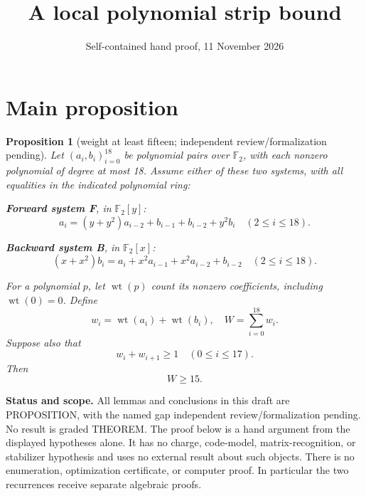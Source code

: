 \documentclass{article}
\title{A local polynomial strip bound}
\author{}
\date{Self-contained hand proof, 11 November 2026}
\newtheorem*{mainproposition}{Proposition}
\DeclareMathOperator{\wt}{wt}
\begin{document}
\maketitle

\section{Main proposition}\label{sec:main}

\begin{mainproposition}[weight at least fifteen; independent review\slash formalization pending]
  Let \((a_i,b_i)_{i=0}^{18}\) be polynomial pairs over \(\mathbb{F}_2\), with each nonzero
  polynomial of degree at most 18. Assume either of these two systems, with all equalities in the
  indicated polynomial ring:

  \textbf{Forward system F}, in \(\mathbb{F}_2[y]\):
  \begin{equation}\label{eq:forward}
    a_i = (y + y^2) a_{i-2} + b_{i-1} + b_{i-2} + y^2 b_i \quad (2 \le i \le 18).
  \end{equation}

  \textbf{Backward system B}, in \(\mathbb{F}_2[x]\):
  \begin{equation}\label{eq:backward}
    (x + x^2) b_i = a_i + x^2 a_{i-1} + x^2 a_{i-2} + b_{i-2} \quad (2 \le i \le 18).
  \end{equation}

  For a polynomial \(p\), let \(\wt(p)\) count its nonzero coefficients, including
  \(\wt(0) = 0\). Define
  \begin{equation}
    w_i = \wt(a_i) + \wt(b_i), \quad W = \sum_{i=0}^{18} w_i.
  \end{equation}
  Suppose also that
  \begin{equation}\label{eq:adjacent}
    w_i + w_{i+1} \ge 1 \quad (0 \le i \le 17).
  \end{equation}
  Then
  \begin{equation}\label{eq:main-bound}
    W \ge 15.
  \end{equation}
\end{mainproposition}

\textbf{Status and scope.} All lemmas and conclusions in this draft are PROPOSITION, with the named
gap independent review\slash formalization pending. No result is graded THEOREM. The proof below is a
hand argument from the displayed hypotheses alone. It has no charge, code-model,
matrix-recognition, or stabilizer hypothesis and uses no external result about such objects. There
is no enumeration, optimization certificate, or computer proof. In particular the two recurrences
receive separate algebraic proofs.
\end{document}
